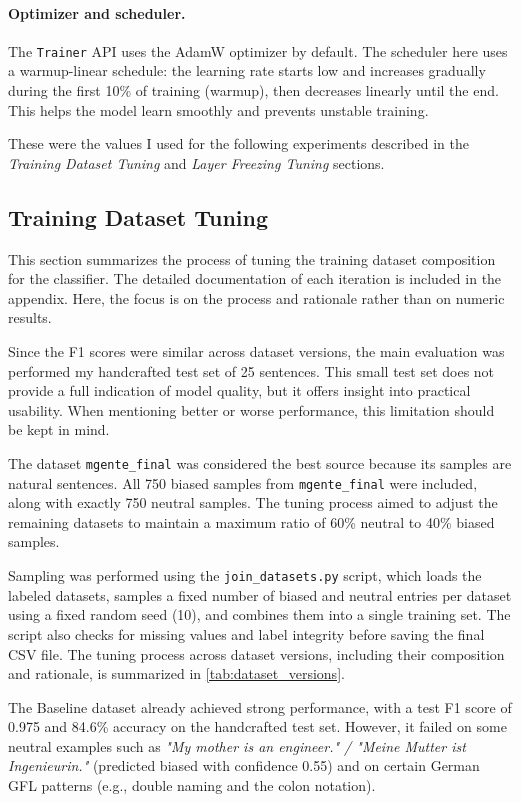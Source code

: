     \paragraph{Optimizer and scheduler.} The \texttt{Trainer} API uses the AdamW optimizer by default. The scheduler here uses a warmup-linear schedule: the learning rate starts low and increases gradually during the first 10\% of training (warmup), then decreases linearly until the end. This helps the model learn smoothly and prevents unstable training.

    These were the values I used for the following experiments described in the \textit{Training Dataset Tuning} and \textit{Layer Freezing Tuning} sections.

\subsection{Training Dataset Tuning} \label{subsection:training_dataset_tuning}
    This section summarizes the process of tuning the training dataset composition for the classifier. The detailed documentation of each iteration is included in the appendix. Here, the focus is on the process and rationale rather than on numeric results.

    Since the F1 scores were similar across dataset versions, the main evaluation was performed my handcrafted test set of 25 sentences. This small test set does not provide a full indication of model quality, but it offers insight into practical usability. When mentioning better or worse performance, this limitation should be kept in mind.

    The dataset \texttt{mgente\_final} was considered the best source because its samples are natural sentences. All 750 biased samples from \texttt{mgente\_final} were included, along with exactly 750 neutral samples. The tuning process aimed to adjust the remaining datasets to maintain a maximum ratio of 60\% neutral to 40\% biased samples.

    Sampling was performed using the \texttt{join\_datasets.py} script, which loads the labeled datasets, samples a fixed number of biased and neutral entries per dataset using a fixed random seed (10), and combines them into a single training set. The script also checks for missing values and label integrity before saving the final CSV file. The tuning process across dataset versions, including their composition and rationale, is summarized in \autoref{tab:dataset_versions}.

    The Baseline dataset already achieved strong performance, with a test F1 score of 0.975 and 84.6\% accuracy on the handcrafted test set. However, it failed on some neutral examples such as \textit{"My mother is an engineer." / "Meine Mutter ist Ingenieurin."} (predicted biased with confidence 0.55) and on certain German GFL patterns (e.g., double naming and the colon notation).


